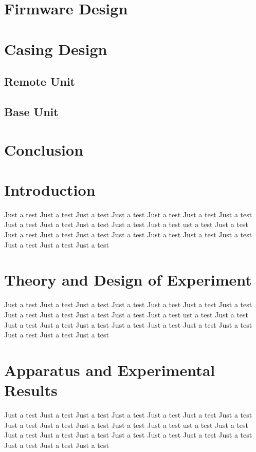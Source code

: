\documentclass[draft]{IIBproject}
\begin{document}
\section{Firmware Design}

\section{Casing Design}

\subsection{Remote Unit}

\subsection{Base Unit}

\section{Conclusion}



\newpage

\section{Introduction}
Just a test Just a test Just a test Just a test Just a test Just a test 
Just a test Just a test Just a test Just a test Just a test Just a test 
ust a test Just a test Just a test Just a test Just a test Just a test 
Just a test Just a test Just a test Just a test Just a test Just a test 

\section{Theory and Design of Experiment}
Just a test Just a test Just a test Just a test Just a test Just a test 
Just a test Just a test Just a test Just a test Just a test Just a test 
ust a test Just a test Just a test Just a test Just a test Just a test 
Just a test Just a test Just a test Just a test Just a test Just a test 

\section{Apparatus and Experimental Results}
Just a test Just a test Just a test Just a test Just a test Just a test 
Just a test Just a test Just a test Just a test Just a test Just a test 
ust a test Just a test Just a test Just a test Just a test Just a test 
Just a test Just a test Just a test Just a test Just a test Just a test 
\end{document}
